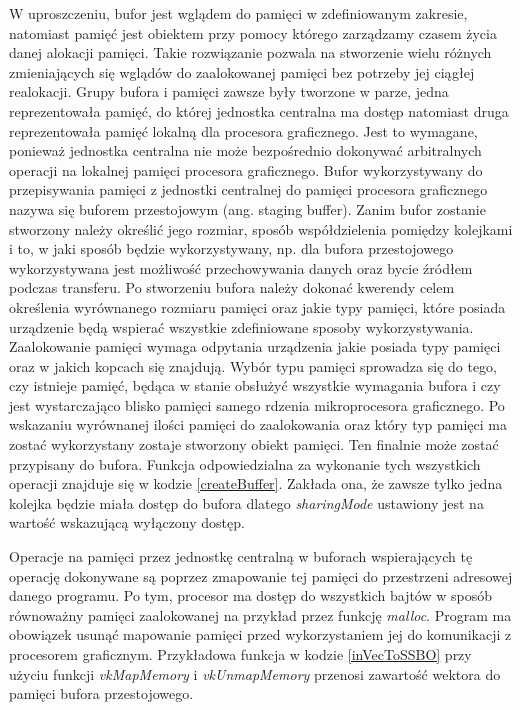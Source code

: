 \pagebreak

W uproszczeniu, bufor jest wglądem do pamięci w zdefiniowanym zakresie, natomiast pamięć jest obiektem przy pomocy którego zarządzamy czasem życia danej alokacji pamięci.
Takie rozwiązanie pozwala na stworzenie wielu różnych zmieniających się wglądów do zaalokowanej pamięci bez potrzeby jej ciągłej realokacji.
Grupy bufora i pamięci zawsze były tworzone w parze, jedna reprezentowała pamięć, do której jednostka centralna ma dostęp natomiast druga reprezentowała pamięć lokalną dla procesora graficznego.
Jest to wymagane, ponieważ jednostka centralna nie może bezpośrednio dokonywać arbitralnych operacji na lokalnej pamięci procesora graficznego.
Bufor wykorzystywany do przepisywania pamięci z jednostki centralnej do pamięci procesora graficznego nazywa się buforem przestojowym (ang. staging buffer).
Zanim bufor zostanie stworzony należy określić jego rozmiar, sposób współdzielenia pomiędzy kolejkami i to, w jaki sposób będzie wykorzystywany, np. dla bufora przestojowego wykorzystywana jest możliwość przechowywania danych oraz bycie źródłem podczas transferu.
Po stworzeniu bufora należy dokonać kwerendy celem określenia wyrównanego rozmiaru pamięci oraz jakie typy pamięci, które posiada urządzenie będą wspierać wszystkie zdefiniowane sposoby wykorzystywania.
Zaalokowanie pamięci wymaga odpytania urządzenia jakie posiada typy pamięci oraz w jakich kopcach się znajdują.
Wybór typu pamięci sprowadza się do tego, czy istnieje pamięć, będąca w stanie obsłużyć wszystkie wymagania bufora i czy jest wystarczająco blisko pamięci samego rdzenia mikroprocesora graficznego.
Po wskazaniu wyrównanej ilości pamięci do zaalokowania oraz który typ pamięci ma zostać wykorzystany zostaje stworzony obiekt pamięci.
Ten finalnie może zostać przypisany do bufora.
Funkcja odpowiedzialna za wykonanie tych wszystkich operacji znajduje się w kodzie \ref{createBuffer}.
Zakłada ona, że zawsze tylko jedna kolejka będzie miała dostęp do bufora dlatego \textit{sharingMode} ustawiony jest na wartość wskazującą wyłączony dostęp.

\pagebreak

Operacje na pamięci przez jednostkę centralną w buforach wspierających tę operację dokonywane są poprzez zmapowanie tej pamięci do przestrzeni adresowej danego programu.
Po tym, procesor ma dostęp do wszystkich bajtów w sposób równoważny pamięci zaalokowanej na przykład przez funkcję \textit{malloc}.
Program ma obowiązek usunąć mapowanie pamięci przed wykorzystaniem jej do komunikacji z procesorem graficznym.
Przykładowa funkcja w kodzie \ref{inVecToSSBO} przy użyciu funkcji \textit{vkMapMemory} i \textit{vkUnmapMemory} przenosi zawartość wektora do pamięci bufora przestojowego.

